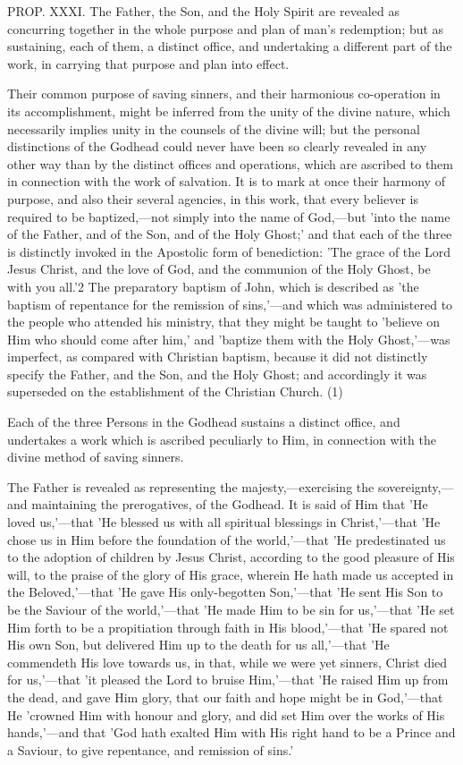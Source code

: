 \documentclass[
]{book}
\begin{document}
PROP. XXXI. The Father, the Son, and the Holy Spirit are revealed as concurring together in the whole purpose and plan of man's redemption; but as sustaining, each of them, a distinct office, and undertaking a different part of the work, in carrying that purpose and plan into effect.

Their common purpose of saving sinners, and their harmonious co-operation in its accomplishment, might be inferred from the unity of the divine nature, which necessarily implies unity in the counsels of the divine will; but the personal distinctions of the Godhead could never have been so clearly revealed in any other way than by the distinct offices and operations, which are ascribed to them in connection with the work of salvation. It is to mark at once their harmony of purpose, and also their several agencies, in this work, that every believer is required to be baptized,---not simply into the name of God,---but 'into the name of the Father, and of the Son, and of the Holy Ghost;' and that each of the three is distinctly invoked in the Apostolic form of benediction: 'The grace of the Lord Jesus Christ, and the love of God, and the communion of the Holy Ghost, be with you all.'2 The preparatory baptism of John, which is described as 'the baptism of repentance for the remission of sins,'---and which was administered to the people who attended his ministry, that they might be taught to 'believe on Him who should come after him,' and 'baptize them with the Holy Ghost,'---was imperfect, as compared with Christian baptism, because it did not distinctly specify the Father, and the Son, and the Holy Ghost; and accordingly it was superseded on the establishment of the Christian Church. (1)

Each of the three Persons in the Godhead sustains a distinct office, and undertakes a work which is ascribed peculiarly to Him, in connection with the divine method of saving sinners.

The Father is revealed as representing the majesty,---exercising the sovereignty,---and maintaining the prerogatives, of the Godhead. It is said of Him that 'He loved us,'---that 'He blessed us with all spiritual blessings in Christ,'---that 'He chose us in Him before the foundation of the world,'---that 'He predestinated us to the adoption of children by Jesus Christ, according to the good pleasure of His will, to the praise of the glory of His grace, wherein He hath made us accepted in the Beloved,'---that 'He gave His only-begotten Son,'---that 'He sent His Son to be the Saviour of the world,'---that 'He made Him to be sin for us,'---that 'He set Him forth to be a propitiation through faith in His blood,'---that 'He spared not His own Son, but delivered Him up to the death for us all,'---that 'He commendeth His love towards us, in that, while we were yet sinners, Christ died for us,'---that 'it pleased the Lord to bruise Him,'---that 'He raised Him up from the dead, and gave Him glory, that our faith and hope might be in God,'---that He 'crowned Him with honour and glory, and did set Him over the works of His hands,'---and that 'God hath exalted Him with His right hand to be a Prince and a Saviour, to give repentance, and remission of sins.'
\end{document}
